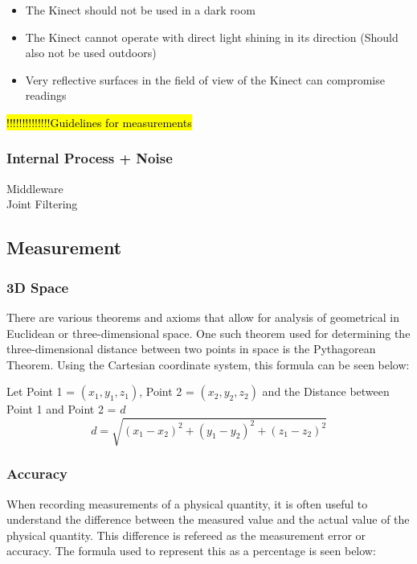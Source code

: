 \begin{itemize}
	\item The Kinect should not be used in a dark room
	\item The Kinect cannot operate with direct light shining in its direction (Should also not be used outdoors)
	\item Very reflective surfaces in the field of view of the Kinect can compromise readings	
\end{itemize} 

\hl{!!!!!!!!!!!!!!Guidelines for measurements} 

\subsubsection{Internal Process + Noise}
Middleware \cite{nonContact2017}\\
Joint Filtering\\

\subsection{Measurement}

\subsubsection{3D Space}
There are various theorems and axioms that allow for analysis of geometrical in Euclidean or three-dimensional space. One such theorem used for determining the three-dimensional distance between two points in space is the Pythagorean Theorem. Using the Cartesian coordinate system, this formula can be seen below: \cite{nonContact2017}

Let Point 1 = $(x_1, y_1, z_1)$, Point 2 = $(x_2, y_2, z_2)$ and the Distance between Point 1 and Point 2 = $d$
\begin{equation} \label{eq: distance}
d = \sqrt{(x_1 - x_2)^{2} + (y_1 - y_2)^{2} + (z_1 - z_2)^{2}}
\end{equation} 

\subsubsection{Accuracy}
When recording measurements of a physical quantity, it is often useful to understand the difference between the measured value and the actual value of the physical quantity. This difference is refereed as the measurement error or accuracy. The formula used to represent this as a percentage is seen below: \cite{nonContact2017}

